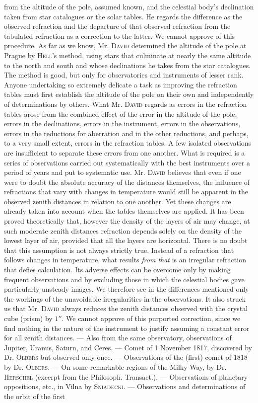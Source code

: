 from the altitude of the pole, assumed known, and the celestial body's declination taken from star catalogues or the solar tables. He regards the difference as the observed refraction and the departure of that observed refraction from the tabulated refraction as a correction to the latter. We cannot approve of this procedure. As far as we know, Mr. \textsc{David} determined the altitude of the pole at Prague by \textsc{Hell}'s method, using stars that culminate at nearly the same altitude to the north and south and whose declinations he takes from the star catalogues. The method is good, but only for observatories and instruments of lesser rank. Anyone undertaking so extremely delicate a task as improving the refraction tables must first establish the altitude of the pole on their own and independently of determinations by others. What Mr. \textsc{David} regards as errors in the refraction tables arose from the combined effect of the error in the altitude of the pole, errors in the declinations, errors in the instrument, errors in the observations, errors in the reductions for aberration and in the other reductions, and perhaps, to a very small extent, errors in the refraction tables. A few isolated observations are insufficient to separate these errors from one another. What is required is a series of observations carried out systematically with the best instruments over a period of years and put to systematic use. Mr. \textsc{David} believes that even if one were to doubt the absolute accuracy of the distances themselves, the influence of refractions that vary with changes in temperature would still be apparent in the observed zenith distances in relation to one another. Yet these changes are already taken into account when the tables themselves are applied. It has been proved theoretically that, however the density of the layers of air may change, at such moderate zenith distances refraction depends solely on the density of the lowest layer of air, provided that all the layers are horizontal. There is no doubt that this assumption is not always strictly true. Instead of a refraction that follows changes in temperature, what results \emph{from that} is an irregular refraction that defies calculation. Its adverse effects can be overcome only by making frequent observations and by excluding those in which the celestial bodies gave particularly unsteady images. We therefore see in the differences mentioned only the workings of the unavoidable irregularities in the observations. It also struck us that Mr. \textsc{David} always reduces the zenith distances observed with the crystal cube (prism) by $1''$. We cannot approve of this purported correction, since we find nothing in the nature of the instrument to justify assuming a constant error for all zenith distances. --- Also from the same observatory, observations of Jupiter, Uranus, Saturn, and Ceres. --- Comet of 1 November 1817, discovered by Dr. \textsc{Olbers} but observed only once. --- Observations of the (first) comet of 1818 by Dr. \textsc{Olbers}. --- On some remarkable regions of the Milky Way, by Dr. \textsc{Herschel} (excerpt from the Philosoph. Transact.). --- Observations of planetary oppositions, etc., in Vilna by \textsc{Sniadecki}. --- Observations and determinations of the orbit of the first 